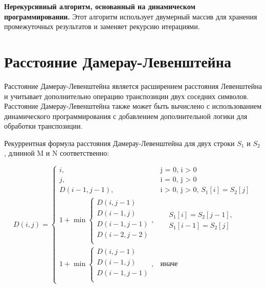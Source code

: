 \documentclass[a4paper, 14pt]{extreport}
\begin{document}
    \textbf{Нерекурсивный алгоритм, основанный на динамическом программировании.} Этот алгоритм использует двумерный массив для хранения промежуточных результатов и заменяет рекурсию итерациями.


    \section{Расстояние Дамерау-Левенштейна}\label{sec:--4}

    Расстояние Дамерау-Левенштейна является расширением расстояния Левенштейна и учитывает дополнительно операцию транспозиции двух соседних символов.
    Расстояние Дамерау-Левенштейна также может быть вычислено с использованием динамического программирования с добавлением дополнительной логики для обработки транспозиции.

    Рекуррентная формула расстояния Дамерау-Левенштейна для двух строки $S_{1}$ и $S_{2}$, длинной M и N соответственно:

    \begin{equation}
        \label{eq:DLev}
        D(i, j) = \begin{cases}
                      i, &\text{j = 0, i > 0} \\
                      j, &\text{i = 0, j > 0} \\
                      D(i - 1, j - 1), &\text{i > 0, j > 0, $S_{1}[i] = S_{2}[j]$} \\
                      1 + \min \begin{cases}
                                   D(i, j - 1)\\
                                   D(i - 1, j)\\
                                   D(i - 1, j - 1) \\
                                   D(i - 2, j - 2) \\
                      \end{cases}, &\begin{aligned}
                                        &\text{$S_{1}[i] = S_{2}[j - 1],$}\\
                                        &\text{$S_{1}[i - 1] = S_{2}[j]$}
                      \end{aligned}\\
                      1 + \min \begin{cases}
                                   D(i, j - 1)\\
                                   D(i - 1, j)\\
                                   D(i - 1, j - 1)\\
                      \end{cases}, &\text{иначе}
        \end{cases}
    \end{equation}
\end{document}
